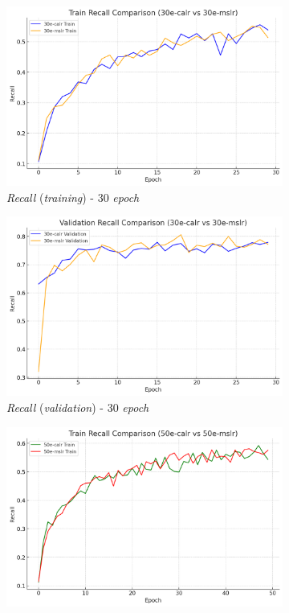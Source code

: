 \begin{figure}[htbp]
  \centering
  \begin{subfigure}{0.45\textwidth}
    \includegraphics[width=\textwidth]{gambar/bab4-train-recall-30e.png}
    \caption{\emph{Recall} (\emph{training}) - 30 \emph{epoch}}
  \end{subfigure}
  \hfill
  \begin{subfigure}{0.45\textwidth}
    \includegraphics[width=\textwidth]{gambar/bab4-val-recall-30e.png}
    \caption{\emph{Recall} (\emph{validation}) - 30 \emph{epoch}}
  \end{subfigure}
  \hfill
  \begin{subfigure}{0.45\textwidth}
    \includegraphics[width=\textwidth]{gambar/bab4-train-recall-50e.png}

\end{subfigure}
\end{figure}
